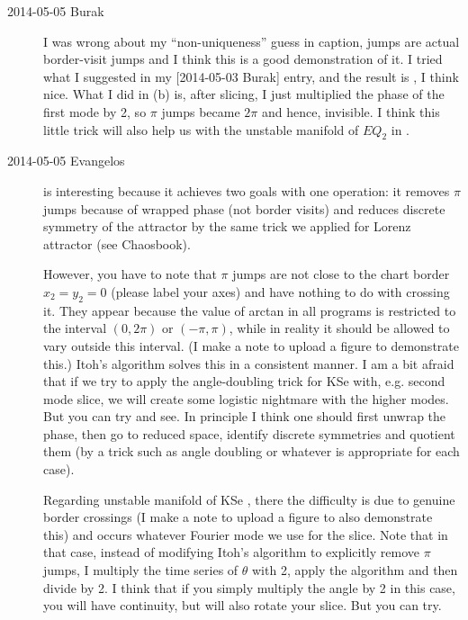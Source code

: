 \begin{description}
\item[2014-05-05 Burak] I was wrong about my  ``non-uniqueness''  guess
in  caption, jumps are actual border-visit
jumps and I think this is a good demonstration of it. I tried what I suggested
in my [2014-05-03 Burak] entry, and the result is ,
I think nice. What I did in  (b) is, after slicing,
I just multiplied the phase of the first mode by 2, so $\pi$ jumps became
$2 \pi$ and hence, invisible. I think this little trick will also help us
with the unstable manifold of $EQ_2$ in \KS .

\item[2014-05-05 Evangelos]  is interesting because it
achieves two goals with one operation: it removes $\pi$ jumps because of
wrapped phase (not border visits) and reduces discrete symmetry of the attractor
by the same trick we applied for Lorenz attractor (see Chaosbook).

However, you have to note that $\pi$ jumps are not close to the chart border
$x_2=y_2=0$ (please label your axes)
and have nothing to do with crossing it. They appear because the value of
arctan in all programs is restricted to the interval $(0,2\pi)$ or $(-\pi,\pi)$,
while in reality it should be allowed to vary outside this interval.
(I make a note to upload a figure to demonstrate this.)
Itoh's algorithm solves this in a consistent manner. I am a bit afraid
that if we try to apply the angle-doubling trick for KSe with, e.g. second mode slice,
we will create some logistic nightmare with the higher modes. But you can try and
see. In principle I think one should first unwrap the phase, then go to reduced
space, identify discrete symmetries and quotient them (by a trick such as angle
doubling or whatever is appropriate for each case).

Regarding unstable manifold of KSe , there the difficulty is due to genuine
border crossings (I make a note to upload a figure to also demonstrate this)
and occurs whatever Fourier mode we use for the slice. Note that in that case,
instead of modifying Itoh's algorithm to explicitly remove $\pi$ jumps, I multiply
the time series of $\theta$ with 2, apply the algorithm and then divide by 2.
I think that if you simply multiply the angle by 2 in this case, you will have
continuity, but will also rotate your slice. But you can try.


\end{description}
